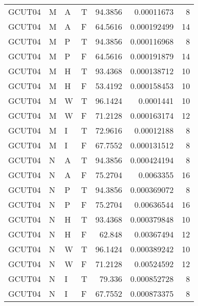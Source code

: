 \begin{tabular}{llllrrr}
    GCUT04   & M     & A     & T          & 94.3856    & 0.00011673  & 8        \\
    GCUT04   & M     & A     & F          & 64.5616    & 0.000192499 & 14       \\
    GCUT04   & M     & P     & T          & 94.3856    & 0.000116968 & 8        \\
    GCUT04   & M     & P     & F          & 64.5616    & 0.000191879 & 14       \\
    GCUT04   & M     & H     & T          & 93.4368    & 0.000138712 & 10       \\
    GCUT04   & M     & H     & F          & 53.4192    & 0.000158453 & 10       \\
    GCUT04   & M     & W     & T          & 96.1424    & 0.0001441   & 10       \\
    GCUT04   & M     & W     & F          & 71.2128    & 0.000163174 & 12       \\
    GCUT04   & M     & I     & T          & 72.9616    & 0.00012188  & 8        \\
    GCUT04   & M     & I     & F          & 67.7552    & 0.000131512 & 8        \\
    GCUT04   & N     & A     & T          & 94.3856    & 0.000424194 & 8        \\
    GCUT04   & N     & A     & F          & 75.2704    & 0.0063355   & 16       \\
    GCUT04   & N     & P     & T          & 94.3856    & 0.000369072 & 8        \\
    GCUT04   & N     & P     & F          & 75.2704    & 0.00636544  & 16       \\
    GCUT04   & N     & H     & T          & 93.4368    & 0.000379848 & 10       \\
    GCUT04   & N     & H     & F          & 62.848     & 0.00367494  & 12       \\
    GCUT04   & N     & W     & T          & 96.1424    & 0.000389242 & 10       \\
    GCUT04   & N     & W     & F          & 71.2128    & 0.00524592  & 12       \\
    GCUT04   & N     & I     & T          & 79.336     & 0.000852728 & 8        \\
    GCUT04   & N     & I     & F          & 67.7552    & 0.000873375 & 8        \\
    \hline
\end{tabular}